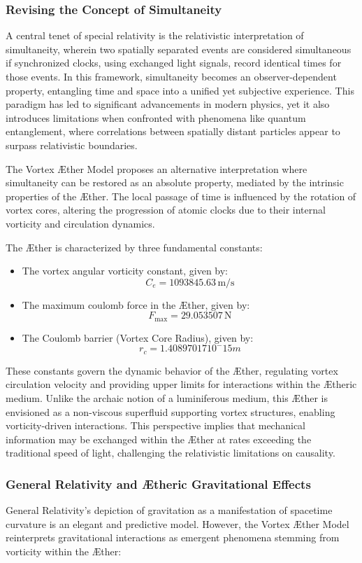 \documentclass[a4paper,10pt]{article}
\begin{document}
    \subsubsection*{Revising the Concept of Simultaneity}
    A central tenet of special relativity is the relativistic interpretation of simultaneity, wherein two spatially separated events are considered simultaneous if synchronized clocks, using exchanged light signals, record identical times for those events. In this framework, simultaneity becomes an observer-dependent property, entangling time and space into a unified yet subjective experience. This paradigm has led to significant advancements in modern physics, yet it also introduces limitations when confronted with phenomena like quantum entanglement, where correlations between spatially distant particles appear to surpass relativistic boundaries.

    The Vortex \AE ther Model proposes an alternative interpretation where simultaneity can be restored as an absolute property, mediated by the intrinsic properties of the \AE ther. The local passage of time is influenced by the rotation of vortex cores, altering the progression of atomic clocks due to their internal vorticity and circulation dynamics.

    The \AE ther is characterized by three fundamental constants:

    \begin{itemize}
        \item The vortex angular vorticity constant, given by: $$C_e = 1093845.63 \, \mathrm{m/s}$$
        \item The maximum coulomb force in the \AE ther, given by:$$F_{\text{max}} = 29.053507 \, \mathrm{N}$$
        \item The Coulomb barrier (Vortex Core Radius), given by: $$r_c = 1.40897017 10^-15 m$$
    \end{itemize}

    These constants govern the dynamic behavior of the \AE ther, regulating vortex circulation velocity and providing upper limits for interactions within the \AE theric medium. Unlike the archaic notion of a luminiferous medium, this \AE ther is envisioned as a non-viscous superfluid supporting vortex structures, enabling vorticity-driven interactions. This perspective implies that mechanical information may be exchanged within the \AE ther at rates exceeding the traditional speed of light, challenging the relativistic limitations on causality.

    \subsubsection*{General Relativity and \AE theric Gravitational Effects}
    General Relativity's depiction of gravitation as a manifestation of spacetime curvature is an elegant and predictive model. However, the Vortex \AE ther Model reinterprets gravitational interactions as emergent phenomena stemming from vorticity within the \AE ther:
\end{document}
